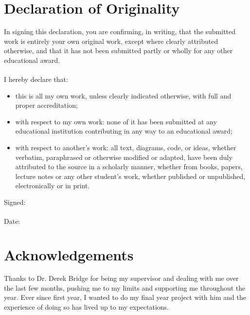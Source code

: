 \documentclass[12pt]{article}
\begin{document}
\section*{Declaration of Originality}
In signing this declaration, you are confirming, in writing, that the submitted work is entirely your own original work, except where clearly attributed otherwise, and that it has not been submitted partly or wholly for any other educational award.
\\\\
I hereby declare that:
\begin{itemize}
  \item this is all my own work, unless clearly indicated otherwise, with full and proper accreditation;
  \item with respect to my own work: none of it has been submitted at any educational institution contributing in any way to an educational award;
  \item with respect to another’s work: all text, diagrams, code, or ideas, whether verbatim, paraphrased or otherwise modified or adapted, have been duly attributed to the source in a scholarly manner, whether from books, papers, lecture notes or any other student’s work, whether published or unpublished, electronically or in print.
\end{itemize}
\vspace{10mm}
\noindent Signed:\dotfill
\\\\
Date:\dotfill
\clearpage

\section*{Acknowledgements}
Thanks to Dr. Derek Bridge for being my supervisor and dealing with me over the last few months, pushing me to my limits and supporting me throughout the year. Ever since first year, I wanted to do my final year project with him and the experience of doing so has lived up to my expectations. 
\clearpage


\tableofcontents
\thispagestyle{empty}
\cleardoublepage
\end{document}
